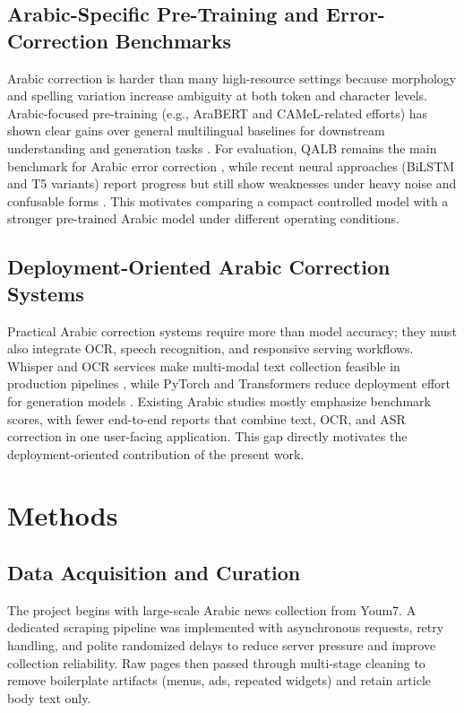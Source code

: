 \documentclass[conference]{IEEEtran}
\begin{document}
\subsection{Arabic-Specific Pre-Training and Error-Correction Benchmarks}
Arabic correction is harder than many high-resource settings because morphology and spelling variation increase ambiguity at both token and character levels. Arabic-focused pre-training (e.g., AraBERT and CAMeL-related efforts) has shown clear gains over general multilingual baselines for downstream understanding and generation tasks \cite{antoun2020arabert,inoue2021camel}. For evaluation, QALB remains the main benchmark for Arabic error correction \cite{rozovskaya2014qalb,rozovskaya2015qalb}, while recent neural approaches (BiLSTM and T5 variants) report progress but still show weaknesses under heavy noise and confusable forms \cite{abandah2022bilstm,qaraghuli2024t5}. This motivates comparing a compact controlled model with a stronger pre-trained Arabic model under different operating conditions.

\subsection{Deployment-Oriented Arabic Correction Systems}
Practical Arabic correction systems require more than model accuracy; they must also integrate OCR, speech recognition, and responsive serving workflows. Whisper and OCR services make multi-modal text collection feasible in production pipelines \cite{radford2023whisper,ocrspace}, while PyTorch and Transformers reduce deployment effort for generation models \cite{paszke2019pytorch,wolf2020transformers}. Existing Arabic studies mostly emphasize benchmark scores, with fewer end-to-end reports that combine text, OCR, and ASR correction in one user-facing application. This gap directly motivates the deployment-oriented contribution of the present work.

\section{Methods}
\subsection{Data Acquisition and Curation}
The project begins with large-scale Arabic news collection from Youm7. A dedicated scraping pipeline was implemented with asynchronous requests, retry handling, and polite randomized delays to reduce server pressure and improve collection reliability. Raw pages then passed through multi-stage cleaning to remove boilerplate artifacts (menus, ads, repeated widgets) and retain article body text only.
\end{document}
